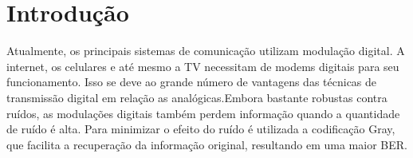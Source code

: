 \newpage
\section{Introdução}
Atualmente, os principais sistemas de comunicação utilizam modulação digital. A internet, os celulares e até mesmo a TV necessitam de modems digitais para seu funcionamento. Isso se deve ao grande número de vantagens das técnicas de transmissão digital em relação as analógicas.Embora bastante robustas contra ruídos, as modulações digitais também perdem informação quando a quantidade de ruído é alta. Para minimizar o efeito do ruído é utilizada a codificação Gray, que facilita a recuperação da informação original, resultando em uma maior BER.
